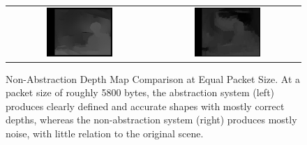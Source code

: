 \begin{figure}[H]
    \begin{center}
      \begin{tabular}{ c c }
        \includegraphics[width=0.47\textwidth]{Figures/abstest.jpg} &
        \includegraphics[width=0.47\textwidth]{Figures/jpgtest.jpg}
      \end{tabular}
      \caption[Non-Abstraction Depth Map Comparison at Equal Packet Size]{Non-Abstraction Depth Map Comparison at Equal Packet Size. At a packet size of roughly 5800 bytes, the abstraction system (left) produces clearly defined and accurate shapes with mostly correct depths, whereas the non-abstraction system (right) produces mostly noise, with little relation to the original scene.}
      \label{fig:absjpg}
    \end{center}
\end{figure}